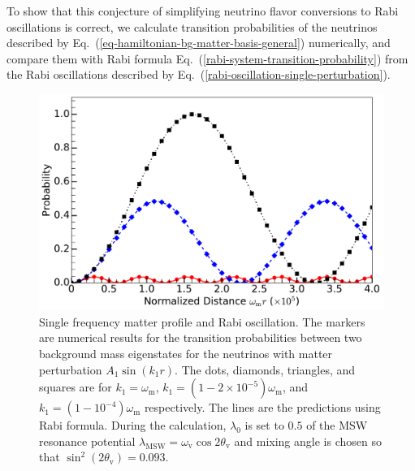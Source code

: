 \documentclass[%
reprint,
 amsmath,amssymb,
 prd,
]{revtex4-1}
\begin{document}

To show that this conjecture of simplifying neutrino flavor conversions to Rabi oscillations is correct, we calculate transition probabilities of the neutrinos described by Eq.~(\ref{eq-hamiltonian-bg-matter-basis-general}) numerically, and compare them with Rabi formula Eq.~(\ref{rabi-system-transition-probability}) from the Rabi oscillations described by Eq.~(\ref{rabi-oscillation-single-perturbation}). 




\begin{figure}
                \includegraphics[width=\columnwidth]{assets/rabiOscillationsNeutrinoCoincidence-single-frequency}
                \caption{Single frequency matter profile and Rabi oscillation. The markers are numerical results for the transition probabilities between two background mass eigenstates for the neutrinos with matter perturbation $A_1\sin(k_1 r)$. The dots, diamonds, triangles, and squares are for $k_1=\omega_{\mathrm m}$, $k_1=(1-2\times 10^{-5})\omega_{\mathrm m}$, and $k_1=(1-10^{-4})\omega_{\mathrm m}$ respectively. The lines are the predictions using Rabi formula. During the calculation, $\lambda_0$ is set to $0.5$ of the MSW resonance potential $\lambda_{\mathrm{MSW}}=\omega_{\mathrm{v}}\cos 2\theta_{\mathrm v}$ and mixing angle is chosen so that $\sin^2(2\theta_{\mathrm v}) = 0.093$.}
                \label{fig-rabiOscillationsNeutrinoCoincidence}
\end{figure}
\end{document}
